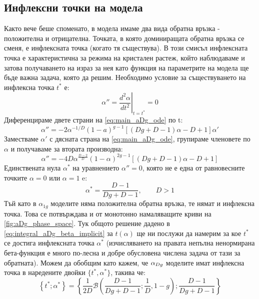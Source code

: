 \subsection{Инфлексни точки на модела}
\label{sub:aDg_infl_points}
Както вече беше споменато, в модела имаме два вида обратна връзка - положителна и отрицателна. Точката, в която доминиращата обратна връзка се сменя, е инфлексната точка (когато тя съществува). В този смисъл инфлексната точка е характеристична за режима на кристален растеж, който наблюдаваме и затова получаването на израз за нея като функция на параметрите на модела ще бъде важна задача, която да решим. Необходимо условие за съществуването на инфлексна точка $t^*$ е:
\begin{equation*}
	\alpha'' = \left. \frac{d^2\alpha}{dt^2}\right|_{t = t^*} = 0
\end{equation*}
Диференцираме двете страни на \autoref{eq:main_aDg_ode} по t:
\begin{equation*}
	\alpha'' = -2 \alpha^{-1/D} (1-a)^{g-1}\left[ \left( D g + D - 1 \right)\alpha - D + 1 \right] \alpha'
\end{equation*}
Заместваме $\alpha'$ с дясната страна на \autoref{eq:main_aDg_ode}, групираме членовете по $\alpha$ и получаваме за втората производна:
\begin{equation}
	\label{eq:aDg_second_der}
	\alpha'' = -4 D \alpha^{\frac{D-2}{D}}(1-\alpha)^{2g-1}\left[(D g + D - 1) \alpha - D + 1\right]
\end{equation}
Единствената нула $\alpha^*$ на уравнението $\alpha'' = 0$, която не е една от равновесните точките $\alpha = 0 $ или $\alpha = 1$ e:
\begin{equation}
	\label{eq:aDg_alpha_infl_point}
	\alpha^* = \frac{D - 1}{D g + D - 1}, \qquad D > 1
\end{equation}  
Тъй като в $\alpha_{1g}$ моделите няма положителна обратна връзка, те нямат и инфлексна точка. Това се потвърждава и от монотонно намаляващите криви на \autoref{fig:aDg_phase_space}.
Тук общото решение дадено в \autoref{eq:integral_aDg_beta_implicit} за $t(\alpha)$ ще ни послужи да намерим за кое $t^*$ се достига инфлексната точка $\alpha^*$ (изчисляването на правата непълна ненормирана бета-функция е много по-лесна и добре обусловена числена задача от тази за обратната). Можем да обобщим като кажем, че $\alpha_{Dg}$ моделите имат инфлексна точка в наредените двойки $\{t^*, \alpha^*\}$, такива че:
\begin{equation}
	\label{eq:aDg_tuple_infl_point}
	\left\{t^*; \alpha^* \right\} = \left\{\frac{1}{2D}\mathcal{B}\left( \frac{D - 1}{D g + D - 1}; \frac{1}{D}, 1 - g \right); \frac{D - 1}{D g + D - 1}\right\} 
\end{equation}
